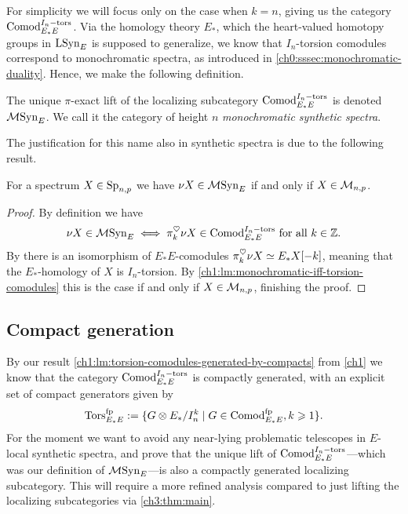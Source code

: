 For simplicity we will focus only on the case when $k=n$, giving us the category $\mathrm{Comod}_{E_*E}^{I_n-\mathrm{tors}}$. Via the homology theory $E_*$, which the heart-valued homotopy groups in $\mathrm{LSyn}_{E}$ is supposed to generalize, we know that $I_n$-torsion comodules correspond to monochromatic spectra, as introduced in \cref{ch0:sssec:monochromatic-duality}. Hence, we make the following definition. 

\begin{definition}
    The unique $\pi$-exact lift of the localizing subcategory $\mathrm{Comod}_{E_*E}^{I_n-\mathrm{tors}}$ is denoted $\mathcal{M}\mathrm{Syn}_{E}$. We call it the category of height $n$ \emph{monochromatic synthetic spectra}. 
\end{definition}

The justification for this name also in synthetic spectra is due to the following result. 

\begin{lemma}
    \label{ch3:add:lm:mono-iff-syn-mono}
    For a spectrum $X\in \mathrm{Sp}_{n,p}$ we have $\nu X \in \mathcal{M}\mathrm{Syn}_{E}$ if and only if $X\in \mathcal{M}_{n,p}$. 
\end{lemma}
\begin{proof}
    By definition we have 
    \[\nu X \in \mathcal{M}\mathrm{Syn}_{E} \iff \pi_k^\heartsuit \nu X \in \mathrm{Comod}_{E_*E}^{I_n-\mathrm{tors}} \text{ for all } k\in \mathbb{Z}.\]
    By \cite[4.21, 4.22]{pstragowski_2022} there is an isomorphism of $E_*E$-comodules $\pi_k^\heartsuit \nu X \simeq E_{*} X[-k]$, meaning that the $E_{*}$-homology of $X$ is $I_n$-torsion. By \cref{ch1:lm:monochromatic-iff-torsion-comodules} this is the case if and only if $X\in \mathcal{M}_{n,p}$, finishing the proof. 
\end{proof}










\subsection{Compact generation}

By our result \cref{ch1:lm:torsion-comodules-generated-by-compacts} from \cref{ch1} we know that the category $\mathrm{Comod}_{E_*E}^{I_n-\mathrm{tors}}$ is compactly generated, with an explicit set of compact generators given by 
\[\mathrm{Tors}_{E_*E}^{\mathrm{fp}} := \{G\otimes E_*/I_n^k \mid G\in \mathrm{Comod}_{E_*E}^{\mathrm{fp}}, k\geqslant 1\}.\]
For the moment we want to avoid any near-lying problematic telescopes in $E$-local synthetic spectra, and prove that the unique lift of $\mathrm{Comod}_{E_*E}^{I_n-\mathrm{tors}}$---which was our definition of $\mathcal{M}\mathrm{Syn}_{E}$---is also a compactly generated localizing subcategory. This will require a more refined analysis compared to just lifting the localizing subcategories via \cref{ch3:thm:main}. 

